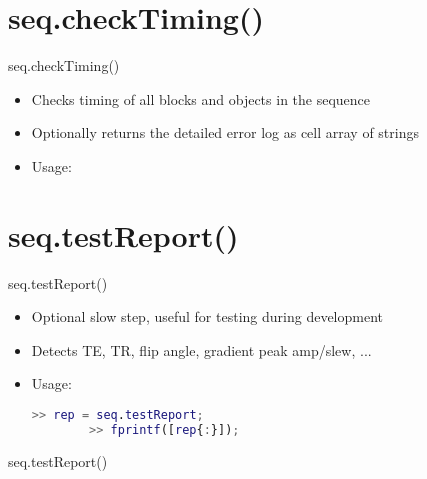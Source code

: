 \documentclass{beamer}
\begin{document}
\section{seq.checkTiming()}
\begin{frame}[fragile]{seq.checkTiming()}

\begin{itemize}
    \item Checks timing of all blocks and objects in the sequence 
    \item Optionally returns the detailed error log as cell array of strings
    \item Usage:
    
\end{itemize}
      
\bigskip

\end{frame}



\section{seq.testReport()}
\begin{frame}[fragile]{seq.testReport()}

\begin{itemize}
    \item Optional slow step, useful for testing during development
    \item Detects TE, TR, flip angle, gradient peak amp/slew, ...
    \item Usage:
        \begin{lstlisting}[language=MATLAB,frame=none]
        >> rep = seq.testReport;
        >> fprintf([rep{:}]);
        \end{lstlisting}
\end{itemize}
\end{frame}

\begin{frame}{seq.testReport()}

\end{frame}



\end{document}
